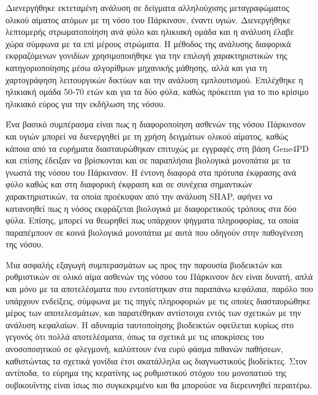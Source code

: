 \documentclass[12pt]{report}
\makeatletter
\let\oldchapter\chapter
\renewcommand{\chapter}{\@ifstar{\starchapter}{\nostarchapter}}
\newcommand{\starchapter}[1]{\oldchapter*{#1}\thispagestyle{mainstyle}}
\newcommand{\nostarchapter}[1]{\oldchapter{#1}\thispagestyle{mainstyle}}
\makeatother
\begin{document}
        \chapter{Συμπεράσματα}
        Διενεργήθηκε εκτεταμένη ανάλυση σε δείγματα αλληλούχισης μεταγραφώματος ολικού αίματος ατόμων με τη νόσο του Πάρκινσον, έναντι υγιών. Διενεργήθηκε λεπτομερής στρωματοποίηση ανά φύλο και ηλικιακή ομάδα και η ανάλυση έλαβε χώρα σύμφωνα με τα επί μέρους στρώματα. Η μέθοδος της ανάλυσης διαφορικά εκφραζόμενων γονιδίων χρησιμοποιήθηκε για την επιλογή χαρακτηριστικών της κατηγοριοποίησης μέσω αλγορίθμων μηχανικής μάθησης, αλλά και για τη χαρτογράφηση λειτουργικών δικτύων και την ανάλυση εμπλουτισμού. Επιλέχθηκε η ηλικιακή ομάδα 50-70 ετών και για τα δύο φύλα, καθώς πρόκειται για το πιο κρίσιμο ηλικιακό εύρος για την εκδήλωση της νόσου.
        \par
        Ένα βασικό συμπέρασμα είναι πως η διαφοροποίηση ασθενών της νόσου Πάρκινσον και υγιών μπορεί να διενεργηθεί με τη χρήση δειγμάτων ολικού αίματος, καθώς κάποια από τα ευρήματα διασταυρώθηκαν επιτυχώς με εγγραφές στη βάση Gene4PD και επίσης έδειξαν να βρίσκονται και σε παραπλήσια βιολογικά μονοπάτια με τα γνωστά της νόσου του Πάρκινσον. Η έντονη διαφορά στα πρότυπα έκφρασης ανά φύλο καθώς και στη διαφορική έκφραση και σε συνέχεια σημαντικών χαρακτηριστικών, τα οποία προέκυψαν από την ανάλυση SHAP, αφήνει να κατανοηθεί πως η νόσος εκφράζεται βιολογικά με διαφορετικούς τρόπους στα δύο φύλα. Επίσης, μπορεί να θεωρηθεί πως υπάρχουν ψήγματα πληροφορίας, τα οποία παραπέμπουν σε κοινά βιολογικά μονοπάτια με αυτά που οδηγούν στην παθογένεση της νόσου. 
        \par
        Μια ασφαλής εξαγωγή συμπερασμάτων ως προς την παρουσία βιοδεικτών και ρυθμιστικών σε ολικό αίμα ασθενών της νόσου του Πάρκινσον δεν είναι δυνατή, απλά και μόνο με τα αποτελέσματα που εντοπίστηκαν στα παραπάνω κεφάλαια, παρόλο που υπάρχουν ενδείξεις, σύμφωνα με τις πηγές πληροφοριών με τις οποίες διασταυρώθηκε μέρος των αποτελεσμάτων, και παρατέθηκαν αντίστοιχα εντός των σχετικών με την ανάλυση κεφαλαίων. Η αδυναμία ταυτοποίησης βιοδεικτών οφείλεται κυρίως στο γεγονός ότι πολλά αποτελέσματα, όπως τα σχετικά με τις αποκρίσεις του ανοσοποιητικού σε φλεγμονή, καλύπτουν ένα ευρύ φάσμα πιθανών παθήσεων, καθιστώντας τα σχετικά γονίδια έτσι ακατάλληλα ως διαγνωστικούς βιοδείκτες. Στον αντίποδα, το εύρημα της κερατίνης ως ρυθμιστικού στόχου του μονοπατιού της ουβικουΐντης είναι ίσως πιο συγκεκριμένο και θα μπορούσε να διερευνηθεί περαιτέρω.
        
\end{document}
